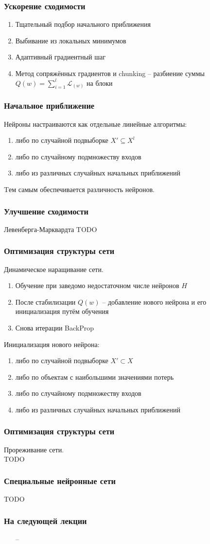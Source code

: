 \documentclass[12pt]{beamer}
\begin{document}
\begin{frame}\frametitle{Ускорение сходимости}
\begin{enumerate}[--]
\item Тщательный подбор начального приближения
\item Выбивание из локальных минимумов
\item Адаптивный градиентный шаг
\item Метод сопряжённых градиентов и chunking -- разбиение суммы $Q(w) = \sum\limits_{i=1}^l \mathcal{L}_(w)$ на блоки
\end{enumerate}
\end{frame}

\begin{frame}\frametitle{Начальное приближение}
Нейроны настраиваются как отдельные линейные алгоритмы:
\begin{enumerate}[--]
\item либо по случайной подвыборке $X' \subseteq X^l$
\item либо по случайному подмножеству входов
\item либо из различных случайных начальных приближений
\end{enumerate}
Tем самым обеспечивается различность нейронов.
\end{frame}

\begin{frame}\frametitle{Улучшение сходимости}
Левенберга-Марквардта
TODO
\end{frame}

\begin{frame}\frametitle{Оптимизация структуры сети}
Динамическое наращивание сети.\\
\begin{enumerate}[--]
\item Обучение при заведомо недостаточном числе нейронов $H$
\item После стабилизации  $Q(w)$ -- добавление нового нейрона и его инициализация путём обучения
\item Снова итерации BackProp
\end{enumerate}

Инициализация нового нейрона:\\
\begin{enumerate}[--]
\item либо по случайной подвыборке $X' \subset X$
\item либо по объектам с наибольшими значениями потерь
\item либо по случайному подмножеству входов
\item либо из различных случайных начальных приближений
\end{enumerate}

\end{frame}

\begin{frame}\frametitle{Оптимизация структуры сети}
Прореживание сети.\\
TODO
\end{frame}


\begin{frame}\frametitle{Специальные нейронные сети}
TODO

\end{frame}

\begin{frame}\frametitle{На следующей лекции}
\begin{itemize}
\item[--] 
\end{itemize}
\end{frame}
\end{document}
